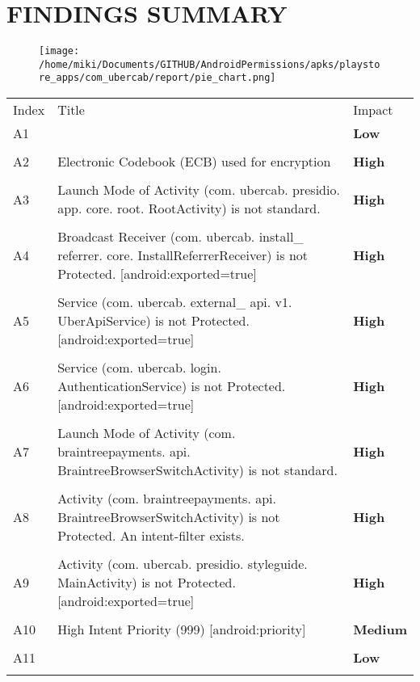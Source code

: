 \documentclass[12p]{article}
\begin{document}
\section{FINDINGS SUMMARY}\label{sec:summary}
\begin{figure}[H]
\centering
	\texttt{[image: /home/miki/Documents/GITHUB/AndroidPermissions/apks/playstore\_apps/com\_ubercab/report/pie\_chart.png]}
\end{figure}
	\begin{longtable}{p{0.5cm} p{10cm} p{1.5cm}}
	\rowcolor{grannysmithapple!70} Index & Title & Impact \\
	A1&& \color{amber}\textbf{Low} \\
\hline\\	A2&Electronic Codebook \newline (ECB) used for encryption& \color{ferrarired}\textbf{High} \\
\hline\\	A3&Launch Mode of Activity \newline (com. ubercab. presidio. app. core. root. RootActivity) is not standard.& \color{ferrarired}\textbf{High} \\
\hline\\	A4&Broadcast Receiver \newline (com. ubercab. install\_ referrer. core. InstallReferrerReceiver) is not Protected. [android:exported=true]& \color{ferrarired}\textbf{High} \\
\hline\\	A5&Service \newline (com. ubercab. external\_ api. v1. UberApiService) is not Protected. [android:exported=true]& \color{ferrarired}\textbf{High} \\
\hline\\	A6&Service \newline (com. ubercab. login. AuthenticationService) is not Protected. [android:exported=true]& \color{ferrarired}\textbf{High} \\
\hline\\	A7&Launch Mode of Activity \newline (com. braintreepayments. api. BraintreeBrowserSwitchActivity) is not standard.& \color{ferrarired}\textbf{High} \\
\hline\\	A8&Activity \newline (com. braintreepayments. api. BraintreeBrowserSwitchActivity) is not Protected. An intent-filter exists.& \color{ferrarired}\textbf{High} \\
\hline\\	A9&Activity \newline (com. ubercab. presidio. styleguide. MainActivity) is not Protected. [android:exported=true]& \color{ferrarired}\textbf{High} \\
\hline\\	A10&High Intent Priority \newline (999) [android:priority]& \color{orange(colorwheel)}\textbf{Medium} \\
\hline\\	A11&& \color{amber}\textbf{Low} \\
\hline\\	\end{longtable}
\end{document}

